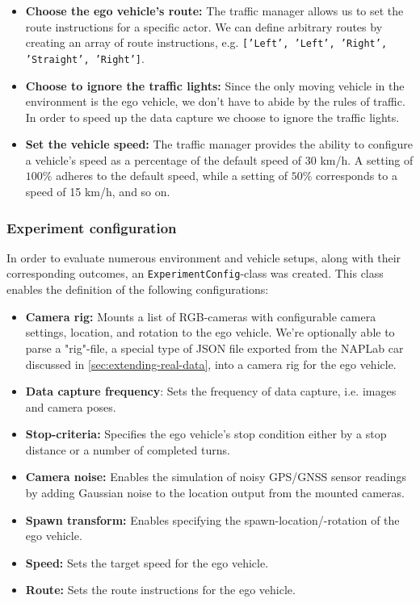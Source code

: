 \begin{itemize}
    \item \textbf{Choose the ego vehicle's route:} The traffic manager allows us to set the route instructions for a specific actor. We can define arbitrary routes by creating an array of route instructions, e.g. \texttt{['Left', 'Left', 'Right', 'Straight', 'Right']}.
    \item \textbf{Choose to ignore the traffic lights:} Since the only moving vehicle in the environment is the ego vehicle, we don't have to abide by the rules of traffic. In order to speed up the data capture we choose to ignore the traffic lights.
    \item \textbf{Set the vehicle speed:} The traffic manager provides the ability to configure a vehicle’s speed as a percentage of the default speed of 30 km/h. A setting of $100\%$ adheres to the default speed, while a setting of $50\%$ corresponds to a speed of 15 km/h, and so on.
\end{itemize}


\subsubsection{Experiment configuration}
In order to evaluate numerous environment and vehicle setups, along with their corresponding outcomes, an \texttt{ExperimentConfig}-class was created. This class enables the definition of the following configurations:

\begin{itemize}
    \item \textbf{Camera rig:} Mounts a list of RGB-cameras with configurable camera settings, location, and rotation to the ego vehicle. We're optionally able to parse a "rig"-file, a special type of JSON file exported from the NAPLab car discussed in \autoref{sec:extending-real-data}, into a camera rig for the ego vehicle. 
    \item \textbf{Data capture frequency}: Sets the frequency of data capture, i.e. images and camera poses.
    \item \textbf{Stop-criteria:} Specifies the ego vehicle's stop condition either by a stop distance or a number of completed turns.
    \item \textbf{Camera noise:} Enables the simulation of noisy GPS/GNSS sensor readings by adding Gaussian noise to the location output from the mounted cameras.
    \item \textbf{Spawn transform:} Enables specifying the spawn-location/-rotation of the ego vehicle.
    \item \textbf{Speed:} Sets the target speed for the ego vehicle.
    \item \textbf{Route:} Sets the route instructions for the ego vehicle.
\end{itemize}


